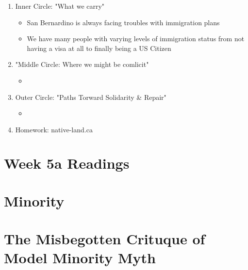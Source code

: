 \documentclass{article}
\begin{document}
  \begin{enumerate}
    \item Inner Circle: "What we carry"
      \begin{itemize}
        \item San Bernardino is always facing troubles with immigration plans
          \item We have many people with varying levels of immigration status from not having a
          visa at all to finally being a US Citizen

      \end{itemize}

    \item "Middle Circle: Where we might be comlicit"
      \begin{itemize}
        \item 
      \end{itemize}

    \item Outer Circle: "Paths Torward Solidarity \& Repair"
      \begin{itemize}
        \item 
      \end{itemize}
    \item Homework: native-land.ca
  \end{enumerate}

  \section*{Week 5a Readings}
  \section{Minority}
  \section{The Misbegotten Crituque of Model Minority Myth}
\end{document}
